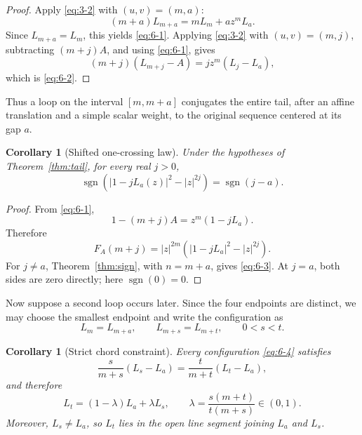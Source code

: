 \documentclass[11pt]{article}
\numberwithin{equation}{section}
\newtheorem{corollary}[theorem]{Corollary}
\theoremstyle{definition}
\begin{document}
\begin{proof}
Apply \eqref{eq:3-2} with \((u,v)=(m,a)\):
\[
 (m+a)L_{m+a}=mL_m+az^mL_a.
\]
Since \(L_{m+a}=L_m\), this yields \eqref{eq:6-1}.  Applying \eqref{eq:3-2} with
\((u,v)=(m,j)\), subtracting \((m+j)A\), and using \eqref{eq:6-1}, gives
\[
 (m+j)(L_{m+j}-A)=jz^m(L_j-L_a),
\]
which is \eqref{eq:6-2}.
\end{proof}

Thus a loop on the interval \([m,m+a]\) conjugates the entire tail, after an
affine translation and a simple scalar weight, to the original sequence
centered at its gap \(a\).

\begin{corollary}[Shifted one-crossing law]\label{cor:shiftedsign}
Under the hypotheses of Theorem~\ref{thm:tail}, for every real \(j>0\),
\begin{equation}
 \operatorname{sgn}
 \left(|1-jL_a(z)|^2-|z|^{2j}\right)
 =\operatorname{sgn}(j-a).
 \label{eq:6-3}
\end{equation}
\end{corollary}

\begin{proof}
From \eqref{eq:6-1},
\[
 1-(m+j)A=z^m(1-jL_a).
\]
Therefore
\[
 F_A(m+j)=|z|^{2m}
 \left(|1-jL_a|^2-|z|^{2j}\right).
\]
For \(j\neq a\), Theorem~\ref{thm:sign}, with \(n=m+a\), gives
\eqref{eq:6-3}.  At \(j=a\), both sides are zero directly; here
\(\operatorname{sgn}(0)=0\).
\end{proof}

Now suppose a second loop occurs later.  Since the four endpoints are distinct,
we may choose the smallest endpoint and write the configuration as
\begin{equation}
 L_m=L_{m+a},
 \qquad
 L_{m+s}=L_{m+t},
 \qquad 0<s<t.
 \label{eq:6-4}
\end{equation}

\begin{corollary}[Strict chord constraint]\label{cor:chord}
Every configuration \eqref{eq:6-4} satisfies
\begin{equation}
 \frac{s}{m+s}(L_s-L_a)
 =\frac{t}{m+t}(L_t-L_a),
 \label{eq:6-5}
\end{equation}
and therefore
\begin{equation}
 L_t=(1-\lambda)L_a+\lambda L_s,
 \qquad
 \lambda=\frac{s(m+t)}{t(m+s)}\in(0,1).
 \label{eq:6-6}
\end{equation}
Moreover, \(L_s\neq L_a\), so \(L_t\) lies in the open line segment joining
\(L_a\) and \(L_s\).
\end{corollary}
\end{document}
